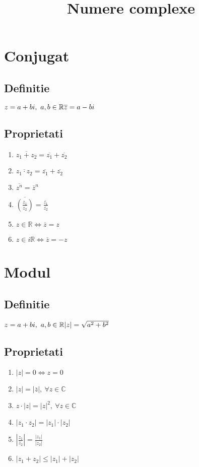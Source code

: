 \documentclass{article}
\title{Numere complexe}
\date{}
\author{}
\begin{document}
\maketitle
\section{Conjugat}

\subsection{Definitie}
$
    z = a+bi,\  a,b \in\mathbb{R}
    \\*
    \overline{z} = a-bi
$

\subsection{Proprietati}
\begin{enumerate}
    \item $ \overline{z_1+z_2} = \overline{z_1} + \overline{z_2}$
    \item $ \overline{z_1\cdot z_2} = \overline{z_1} + \overline{z_2}$
    \item $ \overline{z^n} = \overline{z}^n$
    \item $ \overline{(\frac{z_1}{z_2})} = \frac{\overline{z_1}}{\overline{z_2}}$
    \item $ z \in \mathbb{R} \Leftrightarrow \overline{z}=z$
    \item $ z \in i\mathbb{R} \Leftrightarrow \overline{z}=-z$
\end{enumerate}

\section{Modul}

\subsection{Definitie}
$
    z = a+bi,\  a,b \in \mathbb{R}
    \\*
    |z| = \sqrt{a^2+b^2}
$

\subsection{Proprietati}
\begin{enumerate}
    \item $ |z| = 0 \Leftrightarrow z=0$
    \item $ |z| = |\overline{z}|,\  \forall z \in \mathbb{C}$
    \item $ z \cdot |z| = |z|^2,\  \forall z \in \mathbb{C}$
    \item $ |z_1 \cdot z_2| = |z_1| \cdot |z_2|$
    \item $ |\frac{z_1}{z_2}| = \frac{|z_1|}{|z_2|} $
    \item $ |z_1 + z_2| \leq |z_1| + |z_2|$
\end{enumerate}
\end{document}
